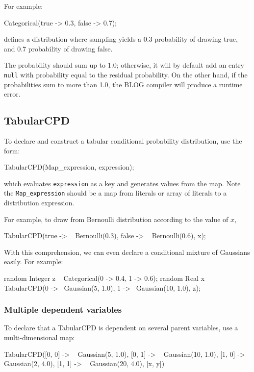 \documentclass[12pt]{article}
\begin{document}
For example:
\begin{blogcode}
Categorical({true -> 0.3, false -> 0.7});
\end{blogcode}
defines a distribution where sampling yields a 0.3 probability of drawing true, and 0.7 probability of drawing false.

The probability should sum up to 1.0; otherwise, it will by default add an entry \texttt{null} with probability
equal to the residual probability.  On the other hand, if the probabilities sum to more than 1.0, the BLOG
compiler will produce a runtime error.


\subsection{TabularCPD}
To declare and construct a tabular conditional probability distribution, use the form:
\begin{blogcode}
TabularCPD(Map_expression, expression);
\end{blogcode}
which evaluates \verb|expression| as a key and generates values from the map. Note the \verb|Map_expression| should be a map from literals or array of literals to a distribution expression. 

For example, to draw from Bernoulli distribution according to the value of $x$, 
\begin{blogcode}
TabularCPD({true -> ~ Bernoulli(0.3), 
            false -> ~ Bernoulli(0.6)}, x);
\end{blogcode}

With this comprehension, we can even declare a conditional mixture of Gaussians easily. For example:
\begin{blogcode}
random Integer z ~ Categorical({0 -> 0.4, 1 -> 0.6});
random Real x ~ TabularCPD({0 -> ~Gaussian(5, 1.0), 
                 1 -> ~Gaussian(10, 1.0)}, z);
\end{blogcode}

\subsubsection{Multiple dependent variables}
To declare that a TabularCPD is dependent on several parent variables, use a multi-dimensional map:
\begin{blogcode}
TabularCPD({[0, 0] -> ~ Gaussian(5, 1.0), 
            [0, 1] -> ~ Gaussian(10, 1.0),
            [1, 0] -> ~ Gaussian(2, 4.0),
            [1, 1] -> ~ Gaussian(20, 4.0)}, [x, y])
\end{blogcode}
\end{document}
